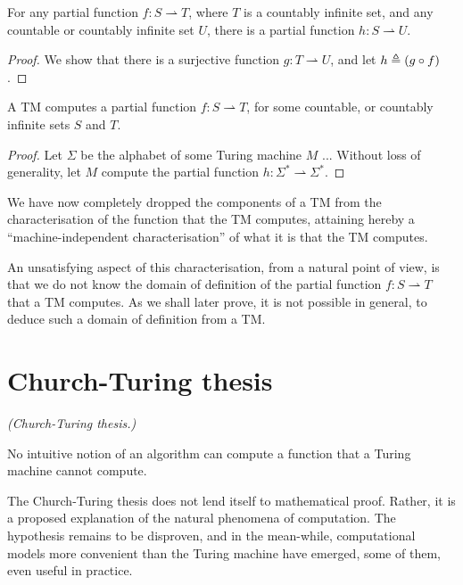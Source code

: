 \begin{lemma} \label{lem:tm-codomain} For any partial function $f : S
\rightharpoonup T$, where $T$ is a countably infinite set, and any countable or
countably infinite set $U$, there is a partial function $h : S \rightharpoonup
U$. \end{lemma}

\begin{proof} We show that there is a surjective function $g : T
\rightharpoonup U$, and let $h \triangleq \mathopen{}\left({g \circ f}\right)\mathclose{}$. \end{proof}

\begin{theorem} \label{thm:tm-machine-independent} A TM computes a partial
function $f : S \rightharpoonup T$, for some countable, or countably infinite
sets $S$ and $T$. \end{theorem}

\begin{proof} Let $\Sigma$ be the alphabet of some Turing machine $M$ ...
Without loss of generality, let $M$ compute the partial function $h : \Sigma^*
\rightharpoonup \Sigma^*$.  \end{proof} 

\begin{remark} We have now completely dropped the components of a TM from the
characterisation of the function that the TM computes, attaining hereby a
``machine-independent characterisation'' of what it is that the TM computes.
\end{remark}

An unsatisfying aspect of this characterisation, from a natural point of view,
is that we do not know the domain of definition of the partial function $f : S
\rightharpoonup T$ that a TM computes. As we shall later prove, it is not
possible in general, to deduce such a domain of definition from a TM.

\section{Church-Turing thesis}

\begin{hypothesis} \textit{(Church-Turing thesis.)}

No intuitive notion of an algorithm can compute a function that a Turing
machine cannot compute.

\end{hypothesis}

The Church-Turing thesis does not lend itself to mathematical proof. Rather, it
is a proposed explanation of the natural phenomena of computation. The
hypothesis remains to be disproven, and in the mean-while, computational models
more convenient than the Turing machine have emerged, some of them, even useful
in practice.

